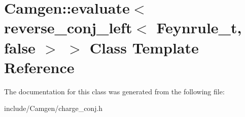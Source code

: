 \hypertarget{a00182}{\section{Camgen\-:\-:evaluate$<$ reverse\-\_\-conj\-\_\-left$<$ Feynrule\-\_\-t, false $>$ $>$ Class Template Reference}
\label{a00182}
}


The documentation for this class was generated from the following file\-:\begin{DoxyCompactItemize}
\item 
include/\-Camgen/charge\-\_\-conj.\-h\end{DoxyCompactItemize}
